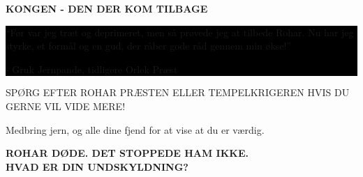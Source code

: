 \documentclass[a5paper,10pt,twoside,openany]{memoir}
\begin{document}
\begin{center}
\begin{tcolorbox}
\begin{center}
      {%
        \sffamily
        \bfseries
        \large
        KONGEN - DEN DER KOM TILBAGE%
      }
    \end{center}

    \vspace{0.5em}

    \noindent
    \colorbox{black}{%
      \parbox{\dimexpr\linewidth-2\fboxsep\relax}{%
        \centering
        \color{white}
        \itshape
        \large

        ``Før var jeg træt og deprimeret, men så prøvede jeg
        at tilbede Rohar. Nu har jeg styrke, et formål og en
        gud, der råber gode råd gennem min økse!''

        \normalfont
        \small

        - Gruk Jernpande, tidligere Orlek Præst
      }%
    }

    \vspace{0.7em}

    \begin{center}
      \colorbox{ForestGreen!70!black}{%
        \parbox{0.88\linewidth}{%
          \centering
          \color{white}
          \sffamily
          \bfseries
          \large

          SPØRG EFTER ROHAR PRÆSTEN ELLER TEMPELKRIGEREN
          HVIS DU GERNE VIL VIDE MERE!

          \smallskip

          \normalsize

          Medbring jern, og alle dine fjend for at vise
          at du er værdig.
        }%
      }
    \end{center}

    \vspace{0.4em}

    \begin{center}
      {%
        \sffamily
        \bfseries
        ROHAR DØDE. DET STOPPEDE HAM IKKE.\\
        HVAD ER DIN UNDSKYLDNING?%
      }
    \end{center}

  \end{tcolorbox}
\end{center}




\vspace*{\fill}

\clearpage
\end{document}
